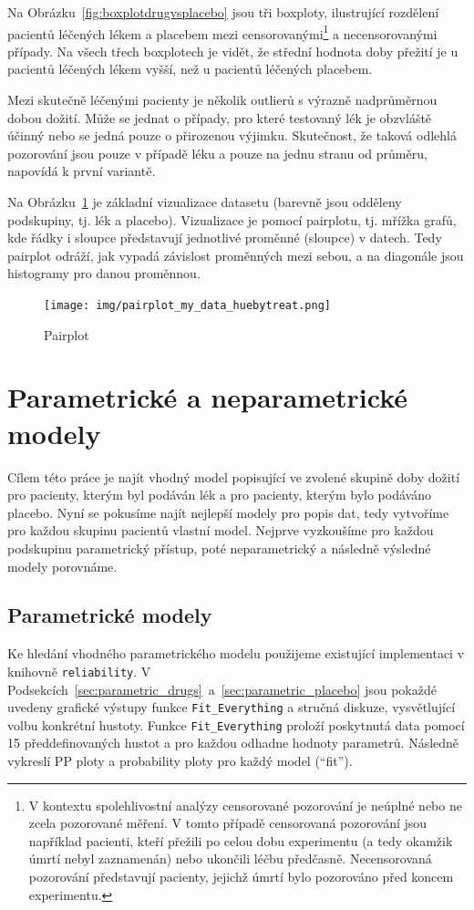 \documentclass[a4, 11pt]{article}
\newcommand{\uvoz}[1]{``{#1}''}                        %
\theoremstyle{definition}
\theoremstyle{remark}
\begin{document}
	Na Obrázku~\ref{fig:boxplotdrugvsplacebo} jsou tři boxploty, ilustrující rozdělení pacientů léčených lékem a placebem mezi censorovanými\footnote{V kontextu spolehlivostní analýzy censorované pozorování je neúplné nebo ne zcela pozorované měření. V tomto případě censorovaná pozorování jsou například pacienti, kteří přežili po celou dobu experimentu (a tedy okamžik úmrtí nebyl zaznamenán) nebo ukončili léčbu předčasně. Necensorovaná pozorování představují pacienty, jejichž úmrtí bylo pozorováno před koncem experimentu.} a necensorovanými případy. 
	Na všech třech boxplotech je vidět, že střední hodnota doby přežití je u pacientů léčených lékem vyšší, než u pacientů léčených placebem. 
	 
	Mezi skutečně léčenými pacienty je několik outlierů s výrazně nadprůměrnou dobou dožití. Může se jednat o případy, pro které testovaný lék je obzvláště účinný nebo se jedná pouze o přirozenou výjimku. Skutečnost, že taková odlehlá pozorování jsou pouze v případě léku a pouze na jednu stranu od průměru, napovídá k první variantě.
	
	Na Obrázku~\ref{fig:pairplot_my_data} je základní vizualizace datasetu (barevně jsou odděleny podskupiny, tj. lék a placebo).
    Vizualizace je pomocí pairplotu, tj. mřížka grafů, kde řádky i sloupce představují jednotlivé proměnné (sloupce) v datech. Tedy pairplot odráží, jak vypadá závislost proměnných mezi sebou, a na diagonále jsou histogramy pro danou proměnnou.
	
	\begin{figure}[H]
		\centering
		\texttt{[image: img/pairplot\_my\_data\_huebytreat.png]}
		\caption{Pairplot}
		\label{fig:pairplot_my_data}
	\end{figure}
	

	\section{Parametrické a neparametrické modely}
    Cílem této práce je najít vhodný model popisující ve zvolené skupině doby dožití pro pacienty, kterým byl podáván lék a pro pacienty, kterým bylo podáváno placebo. 
	Nyní se pokusíme najít nejlepší modely pro popis dat, tedy vytvoříme pro každou skupinu pacientů vlastní model. Nejprve vyzkoušíme pro každou podskupinu parametrický přístup, poté neparametrický a následně výsledné modely porovnáme.
	
	
	\subsection{Parametrické modely} \label{sec:parametric_all}
	Ke hledání vhodného parametrického modelu použijeme existující implementaci v knihovně \texttt{reliability}. 
	V Podsekcích~\ref{sec:parametric_drugs}~a~\ref{sec:parametric_placebo} jsou pokaždé uvedeny grafické výstupy funkce \texttt{Fit\_Everything} a stručná diskuze, vysvětlující volbu konkrétní hustoty.
	Funkce \texttt{Fit\_Everything} proloží poskytnutá data pomocí 15 předdefinovaných hustot a pro každou odhadne hodnoty parametrů. Následně vykreslí PP ploty a probability ploty pro každý model (\uvoz{fit}).
	
\end{document}
